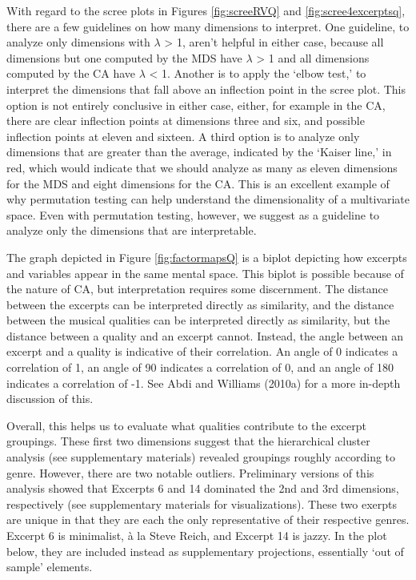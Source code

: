 \documentclass[
  english,
  man,floatsintext]{apa6}
\begin{document}
With regard to the scree plots in Figures \ref{fig:screeRVQ} and \ref{fig:scree4excerptsq}, there are a few guidelines on how many dimensions to interpret. One guideline, to analyze only dimensions with \(\lambda\) \textgreater{} 1, aren't helpful in either case, because all dimensions but one computed by the MDS have \(\lambda\) \textgreater{} 1 and all dimensions computed by the CA have \(\lambda\) \textless{} 1. Another is to apply the `elbow test,' to interpret the dimensions that fall above an inflection point in the scree plot. This option is not entirely conclusive in either case, either, for example in the CA, there are clear inflection points at dimensions three and six, and possible inflection points at eleven and sixteen. A third option is to analyze only dimensions that are greater than the average, indicated by the `Kaiser line,' in red, which would indicate that we should analyze as many as eleven dimensions for the MDS and eight dimensions for the CA. This is an excellent example of why permutation testing can help understand the dimensionality of a multivariate space. Even with permutation testing, however, we suggest as a guideline to analyze only the dimensions that are interpretable.

The graph depicted in Figure \ref{fig:factormapsQ} is a biplot depicting how excerpts and variables appear in the same mental space. This biplot is possible because of the nature of CA, but interpretation requires some discernment. The distance between the excerpts can be interpreted directly as similarity, and the distance between the musical qualities can be interpreted directly as similarity, but the distance between a quality and an excerpt cannot. Instead, the angle between an excerpt and a quality is indicative of their correlation. An angle of 0 indicates a correlation of 1, an angle of 90 indicates a correlation of 0, and an angle of 180 indicates a correlation of -1. See Abdi and Williams (2010a) for a more in-depth discussion of this.

Overall, this helps us to evaluate what qualities contribute to the excerpt groupings. These first two dimensions suggest that the hierarchical cluster analysis (see supplementary materials) revealed groupings roughly according to genre. However, there are two notable outliers. Preliminary versions of this analysis showed that Excerpts 6 and 14 dominated the 2nd and 3rd dimensions, respectively (see supplementary materials for visualizations). These two exerpts are unique in that they are each the only representative of their respective genres. Excerpt 6 is minimalist, à la Steve Reich, and Excerpt 14 is jazzy. In the plot below, they are included instead as supplementary projections, essentially `out of sample' elements.
\end{document}
